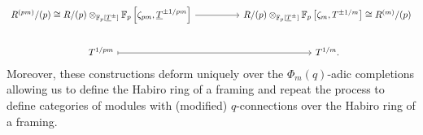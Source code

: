 \footnotesize
$$%
\begin{tikzcd}
	{R^{(pm)}/(p)\cong R/(p)\otimes_{\FF_{p}[\underline{T}^{\pm}]}\FF_{p}\left[\zeta_{pm},\underline{T}^{\pm 1/pm}\right]} && {R/(p)\otimes_{\FF_{p}[\underline{T}^{\pm}]}\FF_{p}\left[\zeta_{m},T^{\pm 1/m}\right]\cong R^{(m)}/(p)} \\
	{T^{1/pm}} && {T^{1/m}.}
	\arrow[from=1-1, to=1-3]
	\arrow[maps to, from=2-1, to=2-3]
\end{tikzcd}$$
\normalsize
Moreover, these constructions deform uniquely over the $\Phi_{m}(q)$-adic completions allowing us to define the Habiro ring of a framing and repeat the process to define categories of modules with (modified) $q$-connections over the Habiro ring of a framing.